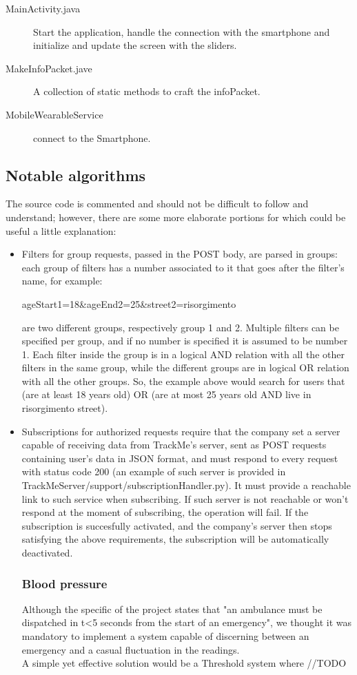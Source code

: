 \documentclass[../main.tex]{subfiles}
\begin{document}
\begin{description}
	\item[MainActivity.java] Start the application, handle the connection with the smartphone and initialize and update the screen with the sliders.
	\item[MakeInfoPacket.jave] A collection of static methods to craft the infoPacket.
	\item[MobileWearableService] connect to the Smartphone.
\end{description}

\subsection{Notable algorithms}

The source code is commented and should not be difficult to follow and understand; however, there are some more elaborate portions for which could be useful a little explanation:

\begin{itemize}

	\item Filters for group requests, passed in the POST body, are parsed in groups: each group of filters has a number associated to it that goes after the filter's name, for example:

	 ageStart1=18\&ageEnd2=25\&street2=risorgimento

	 are two different groups, respectively group 1 and 2. Multiple filters can be specified per group, and if no number is specified it is assumed to be number 1. Each filter inside the group is in a logical AND relation with all the other filters in the same group, while the different groups are in logical OR relation with all the other groups. So, the example above would search for users that (are at least 18 years old) OR (are at most 25 years old AND live in risorgimento street).
	\item Subscriptions for authorized requests require that the company set a server capable of receiving data from TrackMe's server, sent as POST requests containing user's data in JSON format, and must respond to every request with status code 200 (an example of such server is provided in TrackMeServer/support/subscriptionHandler.py). It must provide a reachable link to such service when subscribing. If such server is not reachable or won't respond at the moment of subscribing, the operation will fail. If the subscription is succesfully activated, and the company's server then stops satisfying the above requirements, the subscription will be automatically deactivated.
	
	\subsubsection{Blood pressure}
	Although the specific of the project states that "an ambulance must be dispatched in t<5 seconds from the start of an emergency", 
	we thought it was mandatory to implement a system capable of discerning between an emergency and a casual fluctuation in the readings.\\
	A simple yet effective solution would be a Threshold system where //TODO
\end{itemize}
\end{document}
